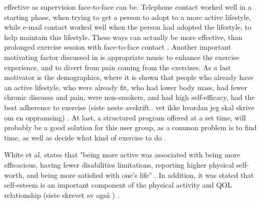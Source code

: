 effective as supervision face-to-face can be. Telephone contact worked well in a starting phase, when trying to get a person to adopt to  a more active lifestyle, while e-mail contact worked well when the person had adopted the lifestyle, to help maintain this lifestyle. These ways can actually be more effective, than prolonged exercise session with face-to-face contact \cite{schutzer}. Another important motivating factor discussed in \cite{schutzer} is appropriate music to enhance the exercise experience, and to divert from pain coming from the exercises. As a last motivator is the demographics, where it is shown that people who already have an active lifestyle, who were already fit, who had lower body mass, had fewer chronic diseases and pain, were non-smokers, and had high self-efficacy, had the best adherence to exercise (siste neste avskrift.. vet ikke hvordan jeg skal skrive om en oppramsing) \cite{schutzer}.
At last, a structured program offered at a set time, will probably be a good solution for this user group, as a common problem is to find time, as well as decide what kind of exercise to do \cite{chao}.

White et al. states that "being more active was associated with being more efficacious, having fewer disabilities limitations, reporting higher physical self-worth, and being more satisfied with one's life" \cite{white}. In addition, it was stated that self-esteem is an important component of the physical activity and QOL relationship (siste skrevet av også ) \cite{white}. 